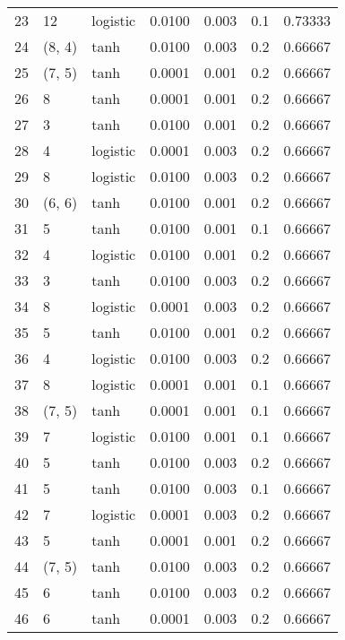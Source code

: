 \begin{tabular}{lllrrrr}
23  &          12 &  logistic &  0.0100 &  0.003 &  0.1 &   0.73333 \\
24  &      (8, 4) &      tanh &  0.0100 &  0.003 &  0.2 &   0.66667 \\
25  &      (7, 5) &      tanh &  0.0001 &  0.001 &  0.2 &   0.66667 \\
26  &           8 &      tanh &  0.0001 &  0.001 &  0.2 &   0.66667 \\
27  &           3 &      tanh &  0.0100 &  0.001 &  0.2 &   0.66667 \\
28  &           4 &  logistic &  0.0001 &  0.003 &  0.2 &   0.66667 \\
29  &           8 &  logistic &  0.0100 &  0.003 &  0.2 &   0.66667 \\
30  &      (6, 6) &      tanh &  0.0100 &  0.001 &  0.2 &   0.66667 \\
31  &           5 &      tanh &  0.0100 &  0.001 &  0.1 &   0.66667 \\
32  &           4 &  logistic &  0.0100 &  0.001 &  0.2 &   0.66667 \\
33  &           3 &      tanh &  0.0100 &  0.003 &  0.2 &   0.66667 \\
34  &           8 &  logistic &  0.0001 &  0.003 &  0.2 &   0.66667 \\
35  &           5 &      tanh &  0.0100 &  0.001 &  0.2 &   0.66667 \\
36  &           4 &  logistic &  0.0100 &  0.003 &  0.2 &   0.66667 \\
37  &           8 &  logistic &  0.0001 &  0.001 &  0.1 &   0.66667 \\
38  &      (7, 5) &      tanh &  0.0001 &  0.001 &  0.1 &   0.66667 \\
39  &           7 &  logistic &  0.0100 &  0.001 &  0.1 &   0.66667 \\
40  &           5 &      tanh &  0.0100 &  0.003 &  0.2 &   0.66667 \\
41  &           5 &      tanh &  0.0100 &  0.003 &  0.1 &   0.66667 \\
42  &           7 &  logistic &  0.0001 &  0.003 &  0.2 &   0.66667 \\
43  &           5 &      tanh &  0.0001 &  0.001 &  0.2 &   0.66667 \\
44  &      (7, 5) &      tanh &  0.0100 &  0.003 &  0.2 &   0.66667 \\
45  &           6 &      tanh &  0.0100 &  0.003 &  0.2 &   0.66667 \\
46  &           6 &      tanh &  0.0001 &  0.003 &  0.2 &   0.66667 \\

\end{tabular}
